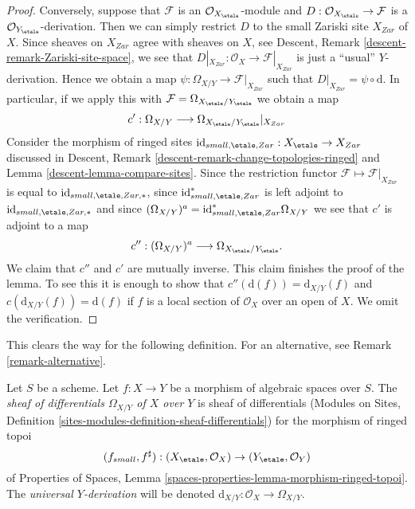 \begin{proof}
\medskip\noindent
Conversely, suppose that $\mathcal{F}$ is an
$\mathcal{O}_{X_\etale}$-module
and $D : \mathcal{O}_{X_\etale} \to \mathcal{F}$ is a
$\mathcal{O}_{Y_\etale}$-derivation. Then we can simply restrict
$D$ to the small Zariski site $X_{Zar}$ of $X$. Since sheaves on $X_{Zar}$
agree with sheaves on $X$, see
Descent, Remark \ref{descent-remark-Zariski-site-space},
we see that $D|_{X_{Zar}} : \mathcal{O}_X \to \mathcal{F}|_{X_{Zar}}$
is just a ``usual'' $Y$-derivation. Hence we obtain a map
$\psi : \Omega_{X/Y} \longrightarrow \mathcal{F}|_{X_{Zar}}$
such that $D|_{X_{Zar}} = \psi \circ \text{d}$. In particular, if we
apply this with $\mathcal{F} = \Omega_{X_\etale/Y_\etale}$
we obtain a map
$$
c' :
\Omega_{X/Y}
\longrightarrow
\Omega_{X_\etale/Y_\etale}|_{X_{Zar}}
$$
Consider the morphism of ringed sites
$\text{id}_{small, \etale, Zar} : X_\etale \to X_{Zar}$
discussed in
Descent, Remark \ref{descent-remark-change-topologies-ringed} and
Lemma \ref{descent-lemma-compare-sites}.
Since the restriction functor $\mathcal{F} \mapsto \mathcal{F}|_{X_{Zar}}$
is equal to $\text{id}_{small, \etale, Zar, *}$, since
$\text{id}_{small, \etale, Zar}^*$ is left adjoint to
$\text{id}_{small, \etale, Zar, *}$ and since
$(\Omega_{X/Y})^a = \text{id}_{small, \etale, Zar}^*\Omega_{X/Y}$
we see that $c'$ is adjoint to a map
$$
c'' :
(\Omega_{X/Y})^a
\longrightarrow
\Omega_{X_\etale/Y_\etale}.
$$
We claim that $c''$ and $c'$ are mutually inverse.
This claim finishes the proof of the lemma.
To see this it is enough to show that $c''(\text{d}(f)) = \text{d}_{X/Y}(f)$
and $c(\text{d}_{X/Y}(f)) = \text{d}(f)$ if $f$ is a local section of
$\mathcal{O}_X$ over an open of $X$. We omit the verification.
\end{proof}

\noindent
This clears the way for the following definition. For an alternative, see
Remark \ref{remark-alternative}.

\begin{definition}
\label{definition-sheaf-differentials}
Let $S$ be a scheme. Let $f : X \to Y$ be a morphism of algebraic spaces
over $S$. The {\it sheaf of differentials $\Omega_{X/Y}$ of $X$ over $Y$}
is sheaf of differentials
(Modules on Sites,
Definition \ref{sites-modules-definition-sheaf-differentials})
for the morphism of ringed topoi
$$
(f_{small}, f^\sharp) :
(X_\etale, \mathcal{O}_X)
\to
(Y_\etale, \mathcal{O}_Y)
$$
of
Properties of Spaces,
Lemma \ref{spaces-properties-lemma-morphism-ringed-topoi}.
The {\it universal $Y$-derivation} will be denoted
$\text{d}_{X/Y} : \mathcal{O}_X \to \Omega_{X/Y}$.
\end{definition}

